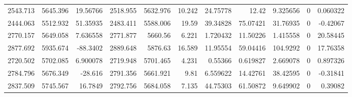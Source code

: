 {\begin{center}
\begin{longtable}{rrrrrrrrrrr}
    2543.713 & 5645.396 & 19.56766 & 2518.955 & 5632.976 & 10.242 & 24.75778 & 12.42 & 9.325656 & 0  & 0.060322 \\
    2444.063 & 5512.932 & 51.35935 & 2483.411 & 5588.006 & 19.59 & 39.34828 & 75.07421 & 31.76935 & 0  & -0.42067 \\
    2770.157 & 5649.058 & 7.636558 & 2771.877 & 5660.56 & 6.221 & 1.720432 & 11.50226 & 1.415558 & 0  & \cellcolor[rgb]{ 1,  .922,  .612}\textcolor[rgb]{ .612,  .396,  0}{20.58445} \\
    2877.692 & 5935.674 & -88.3402 & 2889.648 & 5876.63 & 16.589 & 11.95554 & 59.04416 & 104.9292 & 0  & \cellcolor[rgb]{ 1,  .922,  .612}\textcolor[rgb]{ .612,  .396,  0}{17.76358} \\
    2720.502 & 5702.085 & 6.900078 & 2719.948 & 5701.465 & 4.231 & 0.55366 & 0.619827 & 2.669078 & 0  & 0.897326 \\
    2784.796 & 5676.349 & -28.616 & 2791.356 & 5661.921 & 9.81 & 6.559622 & 14.42761 & 38.42595 & 0  & -0.31841 \\
    2837.509 & 5745.567 & 16.7849 & 2792.756 & 5684.058 & 7.135 & 44.75303 & 61.50872 & 9.649902 & 0  & 0.39082 \\
    \end{longtable}%
\end{center}%
 }



